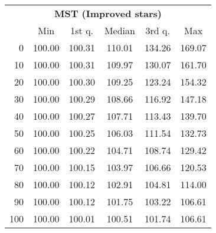\begin{tabular}{r|ccccc}
  \multicolumn{6}{c}{{\bf MST (Improved stars)}} \\
  & Min & 1st q. & Median & 3rd q. & Max \\ \hline\hline
  0 & 100.00 & 100.31 & 110.01 & 134.26 & 169.07
\\ 10 & 100.00 & 100.31 & 109.97 & 130.07 & 161.70
\\ 20 & 100.00 & 100.30 & 109.25 & 123.24 & 154.32
\\ 30 & 100.00 & 100.29 & 108.66 & 116.92 & 147.18
\\ 40 & 100.00 & 100.27 & 107.71 & 113.43 & 139.70
\\ 50 & 100.00 & 100.25 & 106.03 & 111.54 & 132.73
\\ 60 & 100.00 & 100.22 & 104.71 & 108.74 & 129.42
\\ 70 & 100.00 & 100.15 & 103.97 & 106.66 & 120.53
\\ 80 & 100.00 & 100.12 & 102.91 & 104.81 & 114.00
\\ 90 & 100.00 & 100.12 & 101.75 & 103.22 & 106.61
\\ 100 & 100.00 & 100.01 & 100.51 & 101.74 & 106.61
\end{tabular}
